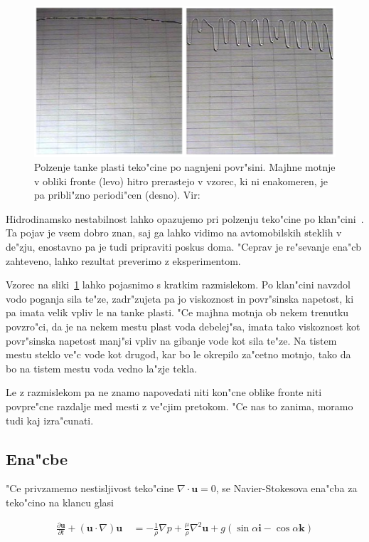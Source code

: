 \documentclass[a4paper,12pt]{article}
\renewcommand{\vec}{\mathbf}
\begin{document}
\begin{figure}[h]
\centering
 \includegraphics[width=.9\textwidth]{./Slike/film-slika}
\caption{Polzenje tanke plasti teko"cine po nagnjeni povr"sini. Majhne motnje v obliki fronte (levo) hitro prerastejo v vzorec, ki ni enakomeren, je pa pribli"zno periodi"cen (desno). Vir: \cite{kondic}}
\label{fig:film-neenakomernost}
\end{figure}

Hidrodinamsko nestabilnost lahko opazujemo pri polzenju teko"cine po klan"cini~\cite{kondic}. Ta pojav je vsem dobro znan, saj ga lahko vidimo na avtomobilskih steklih v de"zju, enostavno pa je tudi pripraviti poskus doma. "Ceprav je re"sevanje ena"cb zahteveno, lahko rezultat preverimo z eksperimentom. 

Vzorec na sliki~\ref{fig:film-neenakomernost} lahko pojasnimo s kratkim razmislekom. Po klan"cini navzdol vodo poganja sila te"ze, zadr"zujeta pa jo viskoznost in povr"sinska napetost, ki pa imata velik vpliv le na tanke plasti. "Ce majhna motnja ob nekem trenutku povzro"ci, da je na nekem mestu plast voda debelej"sa, imata tako viskoznost kot povr"sinska napetost manj"si vpliv na gibanje vode kot sila te"ze. Na tistem mestu steklo ve"c vode kot drugod, kar bo le okrepilo za"cetno motnjo, tako da bo na tistem mestu voda vedno la"zje tekla. 

Le z razmislekom pa ne znamo napovedati niti kon"cne oblike fronte niti povpre"cne razdalje med mesti z ve"cjim pretokom. "Ce nas to zanima, moramo tudi kaj izra"cunati. 

\subsection{Ena"cbe}

"Ce privzamemo nestisljivost teko"cine $\nabla \cdot \vec u = 0$, se Navier-Stokesova ena"cba za teko"cino na klancu glasi 

\begin{align}
 \label{eq:ns-film}
 \frac{\partial \vec u}{\partial t} + (\vec u \cdot \nabla) \vec u\ &= -\frac{1}{\rho}\nabla p + \frac{\mu}{\rho}\nabla^2 \vec u + g (\sin \alpha \vec i - \cos \alpha \vec k)
\end{align}
\end{document}
